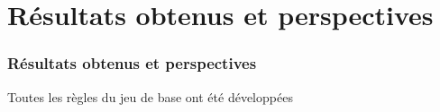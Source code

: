 \section{Résultats obtenus et perspectives}
	\begin{frame}
		\frametitle{Résultats obtenus et perspectives}
		\begin{block}{}
			Toutes les règles du jeu de base ont été développées
		\end{block}
\end{frame}